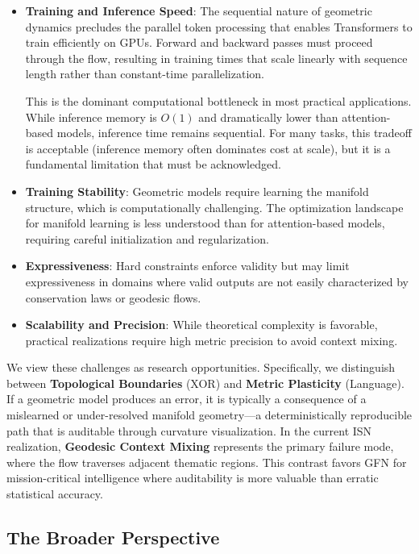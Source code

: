 \documentclass[12pt,a4paper]{article}
\begin{document}
\begin{itemize}
    \item \textbf{Training and Inference Speed}: The sequential nature of geometric dynamics precludes the parallel token processing that enables Transformers to train efficiently on GPUs. Forward and backward passes must proceed through the flow, resulting in training times that scale linearly with sequence length rather than constant-time parallelization.

    This is the dominant computational bottleneck in most practical applications. While inference memory is $O(1)$ and dramatically lower than attention-based models, inference time remains sequential. For many tasks, this tradeoff is acceptable (inference memory often dominates cost at scale), but it is a fundamental limitation that must be acknowledged.

    \item \textbf{Training Stability}: Geometric models require learning the manifold structure, which is computationally challenging. The optimization landscape for manifold learning is less understood than for attention-based models, requiring careful initialization and regularization.

    \item \textbf{Expressiveness}: Hard constraints enforce validity but may limit expressiveness in domains where valid outputs are not easily characterized by conservation laws or geodesic flows.

    \item \textbf{Scalability and Precision}: While theoretical complexity is favorable, practical realizations require high metric precision to avoid context mixing.
\end{itemize}

We view these challenges as research opportunities. Specifically, we distinguish between \textbf{Topological Boundaries} (XOR) and \textbf{Metric Plasticity} (Language). If a geometric model produces an error, it is typically a consequence of a mislearned or under-resolved manifold geometry—a deterministically reproducible path that is auditable through curvature visualization. In the current ISN realization, \textbf{Geodesic Context Mixing} represents the primary failure mode, where the flow traverses adjacent thematic regions. This contrast favors GFN for mission-critical intelligence where auditability is more valuable than erratic statistical accuracy.

\subsection{The Broader Perspective}
\label{sec:broader-perspective}
\end{document}
